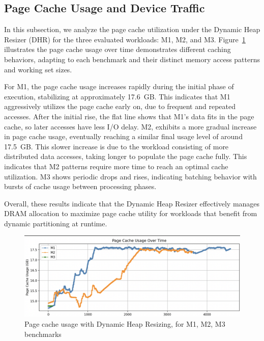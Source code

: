 \subsection{Page Cache Usage and Device Traffic}

In this subsection, we analyze the page cache utilization under the Dynamic Heap Resizer
(DHR) for the three evaluated workloads: M1, M2, and M3. Figure~\ref{fig:pc_dhr} 
illustrates the page cache usage over time demonstrates different caching behaviors, 
adapting to each benchmark and their distinct memory access patterns and working set sizes.

For M1, the page cache usage increases rapidly during the initial phase of execution, 
stabilizing at approximately 17.6~GB. This indicates that M1 aggressively utilizes 
the page cache early on, due to frequent and repeated accesses.
After the initial rise, the flat line shows that M1's data fits in the page cache, so later accesses have less I/O delay.
M2, exhibits a more gradual increase in page cache usage, 
eventually reaching a similar final usage level of around 17.5~GB.
This slower increase is due to the workload consisting of more distributed 
data accesses, taking longer to populate the page cache fully. This 
indicates that M2 patterns require more time to reach an optimal cache utilization.
M3 shows periodic drops and rises, indicating batching behavior with bursts of cache usage between processing phases.

Overall, these results indicate that the Dynamic Heap Resizer effectively manages DRAM allocation to maximize page
cache utility for workloads that benefit from dynamic partitioning at runtime. 

\begin{figure}[htbp]
  \centering
  \includegraphics[width=1\columnwidth]{fig/pagecache_dhr.png}
  \caption{Page cache usage with Dynamic Heap Resizing, for M1, M2, M3 benchmarks}
  \label{fig:pc_dhr}
\end{figure}

